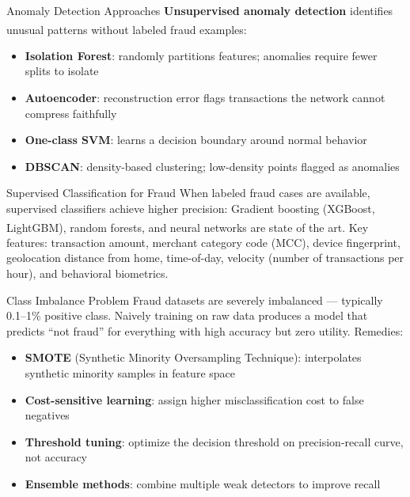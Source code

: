 \begin{v3topic}{Anomaly Detection Approaches}
    \textbf{Unsupervised anomaly detection} identifies unusual patterns without labeled fraud examples\textsuperscript{\cite[][p.~150]{jansenMachineLearningAlgorithmic2020}}:
\visualseparator
    \begin{itemize}
        \item \textbf{Isolation Forest}: randomly partitions features; anomalies require fewer splits to isolate
        \item \textbf{Autoencoder}: reconstruction error flags transactions the network cannot compress faithfully
        \item \textbf{One-class SVM}: learns a decision boundary around normal behavior
        \item \textbf{DBSCAN}: density-based clustering; low-density points flagged as anomalies
    \end{itemize}

\end{v3topic}
\begin{v3topic}{Supervised Classification for Fraud}
    When labeled fraud cases are available, supervised classifiers achieve higher precision:
    Gradient boosting (XGBoost, LightGBM), random forests, and neural networks are state of the art\textsuperscript{\cite[][pp.~345--346]{jansenMachineLearningAlgorithmic2020}}.
    Key features: transaction amount, merchant category code (MCC), device fingerprint, geolocation distance from home, time-of-day, velocity (number of transactions per hour), and behavioral biometrics.

\end{v3topic}
\begin{v3topic}{Class Imbalance Problem}
    Fraud datasets are severely imbalanced — typically 0.1--1\% positive class.
    Naively training on raw data produces a model that predicts ``not fraud'' for everything with high accuracy but zero utility.
\visualseparator
    Remedies:
    \begin{itemize}
        \item \textbf{SMOTE} (Synthetic Minority Oversampling Technique): interpolates synthetic minority samples in feature space
        \item \textbf{Cost-sensitive learning}: assign higher misclassification cost to false negatives
        \item \textbf{Threshold tuning}: optimize the decision threshold on precision-recall curve, not accuracy
        \item \textbf{Ensemble methods}: combine multiple weak detectors to improve recall
    \end{itemize}

\end{v3topic}
